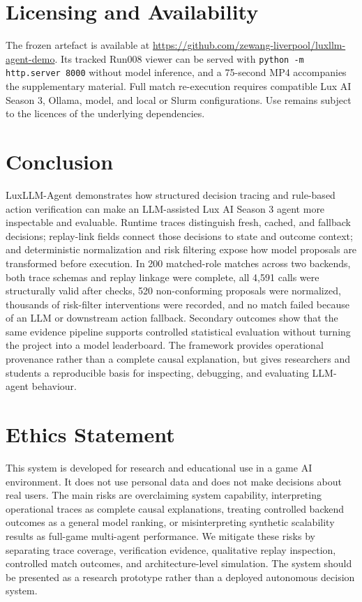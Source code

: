 \documentclass[11pt]{article}
\begin{document}
\section{Licensing and Availability}

The frozen artefact is available at \url{https://github.com/zewang-liverpool/luxllm-agent-demo}. Its tracked Run008 viewer can be served with \texttt{python -m http.server 8000} without model inference, and a 75-second MP4 accompanies the supplementary material. Full match re-execution requires compatible Lux AI Season 3, Ollama, model, and local or Slurm configurations. Use remains subject to the licences of the underlying dependencies.

\section{Conclusion}

LuxLLM-Agent demonstrates how structured decision tracing and rule-based action verification can make an LLM-assisted Lux AI Season 3 agent more inspectable and evaluable. Runtime traces distinguish fresh, cached, and fallback decisions; replay-link fields connect those decisions to state and outcome context; and deterministic normalization and risk filtering expose how model proposals are transformed before execution. In 200 matched-role matches across two backends, both trace schemas and replay linkage were complete, all 4,591 calls were structurally valid after checks, 520 non-conforming proposals were normalized, thousands of risk-filter interventions were recorded, and no match failed because of an LLM or downstream action fallback. Secondary outcomes show that the same evidence pipeline supports controlled statistical evaluation without turning the project into a model leaderboard. The framework provides operational provenance rather than a complete causal explanation, but gives researchers and students a reproducible basis for inspecting, debugging, and evaluating LLM-agent behaviour.

\section*{Ethics Statement}

This system is developed for research and educational use in a game AI environment. It does not use personal data and does not make decisions about real users. The main risks are overclaiming system capability, interpreting operational traces as complete causal explanations, treating controlled backend outcomes as a general model ranking, or misinterpreting synthetic scalability results as full-game multi-agent performance. We mitigate these risks by separating trace coverage, verification evidence, qualitative replay inspection, controlled match outcomes, and architecture-level simulation. The system should be presented as a research prototype rather than a deployed autonomous decision system.
\end{document}
